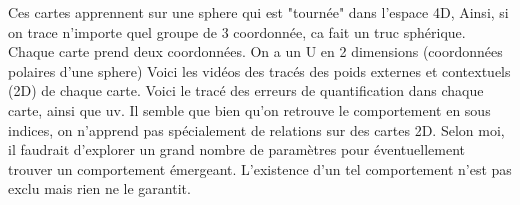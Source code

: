 \documentclass[../main]{subfiles}
\begin{document}
Ces cartes apprennent sur une sphere qui est "tournée" dans l'espace 4D, Ainsi, si on trace n'importe quel groupe de 3 coordonnée, ca fait un truc sphérique. Chaque carte prend deux coordonnées.
On a un U en 2 dimensions (coordonnées polaires d'une sphere)
Voici les vidéos des tracés des poids externes et contextuels (2D) de chaque carte.
Voici le tracé des erreurs de quantification dans chaque carte, ainsi que uv.
Il semble que bien qu'on retrouve le comportement en sous indices, on n'apprend pas spécialement de relations sur des cartes 2D. Selon moi, il faudrait d'explorer un grand nombre de paramètres pour éventuellement trouver un comportement émergeant. L'existence d'un tel comportement n'est pas exclu mais rien ne le garantit.



\ifSubfilesClassLoaded{
    \printbibliography
}{}
\end{document}

